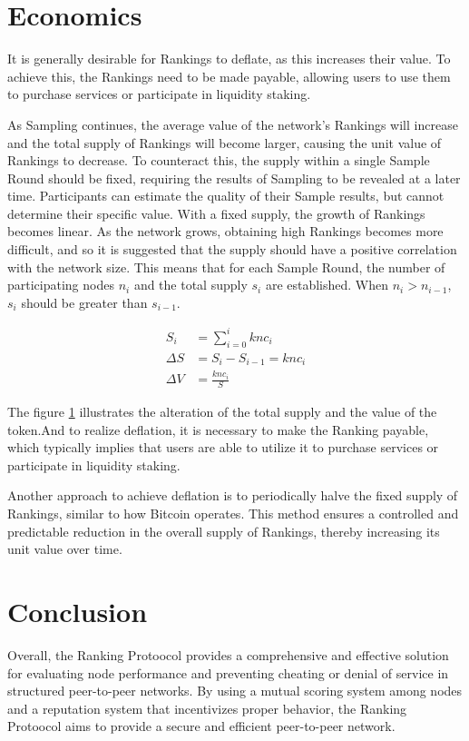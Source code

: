 \documentclass[twocolumn]{article}
\begin{document}
\section{Economics}


It is generally desirable for Rankings to deflate, as this increases their value. To achieve this, the Rankings need to be made payable, allowing users to use them to purchase services or participate in liquidity staking.

As Sampling continues, the average value of the network's Rankings will increase and the total supply of Rankings will become larger, causing the unit value of Rankings to decrease. To counteract this, the supply within a single Sample Round should be fixed, requiring the results of Sampling to be revealed at a later time. Participants can estimate the quality of their Sample results, but cannot determine their specific value. With a fixed supply, the growth of Rankings becomes linear. As the network grows, obtaining high Rankings becomes more difficult, and so it is suggested that the supply should have a positive correlation with the network size. This means that for each Sample Round, the number of participating nodes $n_i$ and the total supply $s_i$ are established. When $n_i > n_{i-1}$, $s_i$ should be greater than $s_{i-1}$.

\begin{figure}[htbp]
  \label{supply}
\begin{align}
  S_i &= \sum_{i=0}^{i}knc_i\\
  \Delta S &= S_i - S_{i-1} = knc_i\\
  \Delta V &= \frac{knc_i}{S}
 \end{align}
\end{figure}

The figure \ref{supply} illustrates the alteration of the total supply and the value of the token.And to realize deflation, it is necessary to make the Ranking payable, which typically implies that users are able to utilize it to purchase services or participate in liquidity staking.

Another approach to achieve deflation is to periodically halve the fixed supply of Rankings, similar to how Bitcoin\cite{bitcoin} operates. This method ensures a controlled and predictable reduction in the overall supply of Rankings, thereby increasing its unit value over time.

\section{Conclusion}
Overall, the Ranking Protoocol provides a comprehensive and effective solution for evaluating node performance and preventing cheating or denial of service in structured peer-to-peer networks. By using a mutual scoring system among nodes and a reputation system that incentivizes proper behavior, the Ranking Protoocol aims to provide a secure and efficient peer-to-peer network.


\end{document}
